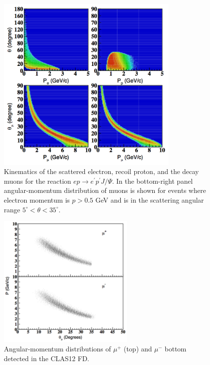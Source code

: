 \begin{figure}[htbp]
\begin{center}
\includegraphics[width=0.8\textwidth]{jpsi_kine.pdf}
\caption{Kinematics of the scattered electron, recoil proton, and the decay muons for the reaction $ep\to e^\prime p^\prime J/\Psi $. In the bottom-right panel angular-momentum distribution of muons is shown for events where electron momentum is $p>0.5$ GeV and is in the scattering angular range $5^\circ <\theta<35^\circ$.}
\label{fig:jp_kine}
\end{center}
\end{figure}

\begin{figure}[htbp]
\begin{center}
\includegraphics[width=0.6\textwidth]{jpsi_muon_p_theta_detected.pdf}
\caption{Angular-momentum distributions of $\mu^+$ (top) and $\mu^-$ bottom detected in the CLAS12 FD. }
\label{fig:jp_mukine}
\end{center}
\end{figure}

